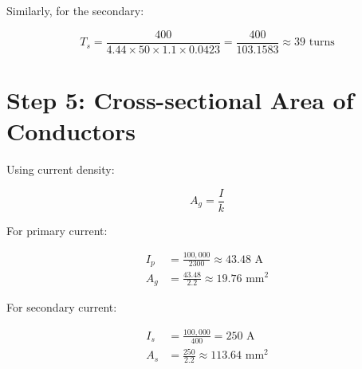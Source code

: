 \documentclass[12pt]{article}
\begin{document}
Similarly, for the secondary:

\begin{equation}
	T_s = \frac{400}{4.44 \times 50 \times 1.1 \times 0.0423} = \frac{400}{103.1583} \approx 39 \text{ turns}
\end{equation}

\section*{Step 5: Cross-sectional Area of Conductors}
Using current density:

\begin{equation}
	A_g = \frac{I}{k}
\end{equation}

For primary current:

\begin{align*}
	I_p &= \frac{100,000}{2300} \approx 43.48 \text{ A} \\
	A_g &= \frac{43.48}{2.2} \approx 19.76 \text{ mm}^2
\end{align*}

For secondary current:

\begin{align*}
	I_s &= \frac{100,000}{400} = 250 \text{ A} \\
	A_s &= \frac{250}{2.2} \approx 113.64 \text{ mm}^2
\end{align*}
\end{document}
